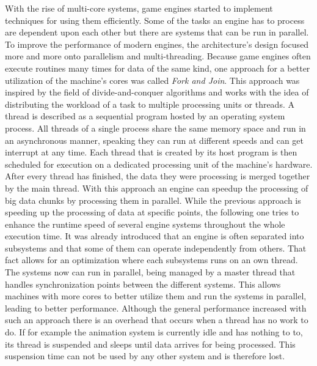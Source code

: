 With the rise of multi-core systems, game engines started to implement techniques for using them efficiently. Some of the tasks an engine has to process are dependent upon each other but there are systems that can be run in parallel. To improve the performance of modern engines, the architecture's design focused more and more onto parallelism and multi-threading. Because game engines often execute routines many times for data of the same kind, one approach for a better utilization of the machine's cores was called \textit{Fork and Join}. This approach was inspired by the field of divide-and-conquer algorithms and works with the idea of distributing the workload of a task to multiple processing units or threads. A thread is described as a sequential program hosted by an operating system process. All threads of a single process share the same memory space and run in an asynchronous manner, speaking they can run at different speeds and can get interrupt at any time. Each thread that is created by its host program is then scheduled for execution on a dedicated processing unit of the machine's hardware. After every thread has finished, the data they were processing is merged together by the main thread. With this approach an engine can speedup the processing of big data chunks by processing them in parallel. 
While the previous approach is speeding up the processing of data at specific points, the following one tries to enhance the runtime speed of several engine systems throughout the whole execution time. It was already introduced that an engine is often separated into subsystems and that some of them can operate independently from others. That fact allows for an optimization where each subsystems runs on an own thread. The systems now can run in parallel, being managed by a master thread that handles synchronization points between the different systems. This allows machines with more cores to better utilize them and run the systems in parallel, leading to better performance. Although the general performance increased with such an approach there is an overhead that occurs when a thread has no work to do. If for example the animation system is currently idle and has nothing to to, its thread is suspended and sleeps until data arrives for being processed. This suspension time can not be used by any other system and is therefore lost.
